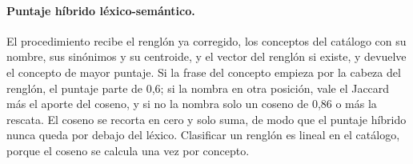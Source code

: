 \begin{algorithm}[H]
\caption{Normalizar un renglón en una demanda.}
\label{alg:anexo-normalizar}
\small
{}
\end{algorithm}

\fi
\paragraph{Puntaje híbrido léxico-semántico.}
El procedimiento recibe el renglón ya corregido, los conceptos del catálogo con su nombre, sus
sinónimos y su centroide, y el vector del renglón si existe, y devuelve el concepto de mayor puntaje.
Si la frase del concepto empieza por la cabeza del renglón, el puntaje parte de 0,6; si la nombra en
otra posición, vale el Jaccard más el aporte del coseno, y si no la nombra solo un coseno de 0,86 o más
la rescata. El coseno se recorta en cero y solo suma, de modo que el puntaje híbrido nunca queda por
debajo del léxico. Clasificar un renglón es lineal en el catálogo, porque el coseno se calcula una vez
por concepto.

